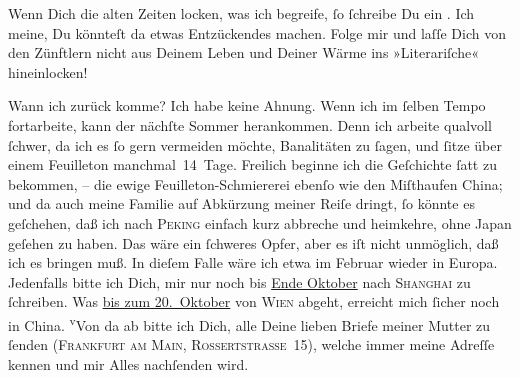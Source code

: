                Wenn Dich die  alten Zeiten locken, was ich begreife,{ }ſo{ }ſchreibe Du ein \label{K_L02854-6v}\label{K_L02854-6}. Ich meine,
               Du könnteſt da etwas Entzückendes machen. Folge mir und laſſe Dich von den Zünftlern
               nicht aus Deinem Leben und Deiner Wärme ins »Literariſche« hineinlocken!\pend
           
\pstart
           {\pb}Wann ich zurück komme? Ich habe keine Ahnung. Wenn
               ich im{ }ſelben Tempo fortarbeite, kann der nächſte Sommer herankommen. Denn ich
               arbeite qualvoll{ }ſchwer, da ich es{ }ſo gern vermeiden möchte, Banalitäten zu{ }ſagen,
               und{ }ſitze über einem Feuilleton manchmal 14 Tage. Freilich beginne ich die Geſchichte{ }ſatt zu bekommen, – die ewige Feuilleton-Schmiererei ebenſo wie den Miſthaufen China; und da  auch meine Familie auf Abkürzung meiner Reiſe {\pb}dringt,{ }ſo könnte es geſchehen, daß ich nach \textsc{Peking} einfach kurz abbreche und heimkehre, ohne Japan geſehen zu haben. Das wäre ein{ }ſchweres Opfer, aber es iſt nicht
               unmöglich, daß ich es bringen muß. In dieſem Falle wäre ich etwa im Februar wieder in Europa. Jedenfalls bitte ich Dich, mir nur noch bis \uline{Ende Oktober} nach \textsc{Shanghai} zu{ }ſchreiben. Was \uline{bis zum 20. Oktober} von \textsc{Wien} abgeht, erreicht mich{ }ſicher noch in China. {\pb}\substVorne{}\textsuperscript{v}\substDazwischen{}V\substHinten{}on da ab bitte ich Dich, alle Deine 
               lieben Briefe meiner Mutter
               zu{ }ſenden (\textsc{Frankfurt am Main,  Rossertstraſse 15}), welche  immer meine
               Adreſſe kennen und mir Alles nachſenden wird.\pend
           
